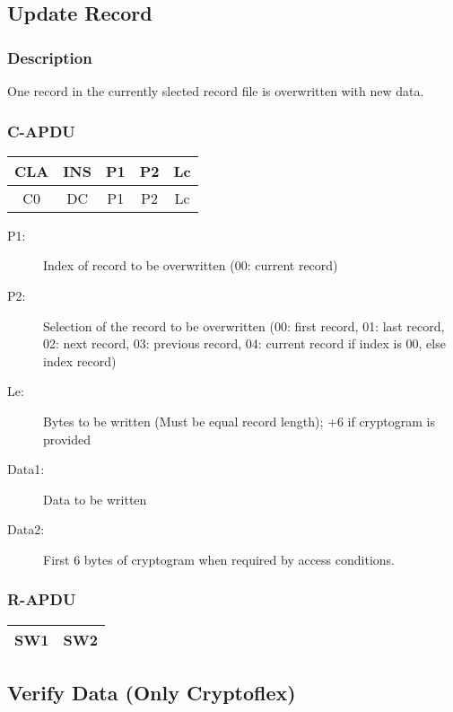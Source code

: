 \documentclass[a4paper,oneside]{article}
\begin{document}
\subsection{Update Record}

\subsubsection*{Description}

One record in the currently slected record file is overwritten
with new data.

\subsubsection*{C-APDU}

\begin{tabular}{|c|c|c|c|c|} \hline
CLA & INS & P1 & P2 & Lc \\ \hline \hline
C0 & DC & P1 & P2 & Lc \\ \hline
\end{tabular}

\begin{description}
\item[P1:] Index of record to be overwritten (00: current record)
\item[P2:] Selection of the record to be overwritten (00: first record,
     01: last record, 02: next record, 03: previous record,
     04: current record if index is 00, else index record)
\item[Le:] Bytes to be written (Must be equal record length);
     +6 if cryptogram is provided
\item[Data1:] Data to be written
\item[Data2:] First 6 bytes of cryptogram when required by access conditions.
\end{description}

\subsubsection*{R-APDU}

\begin{tabular}{|c|c|} \hline
SW1 & SW2 \\ \hline
\end{tabular}


\subsection{Verify Data (Only Cryptoflex)}
\end{document}
